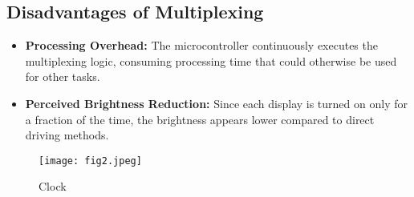 \documentclass[12pt]{article}
\begin{document}
\subsection{Disadvantages of Multiplexing}
\begin{itemize}
    \item \textbf{Processing Overhead:} The microcontroller continuously executes the multiplexing logic, consuming processing time that could otherwise be used for other tasks.
    \item \textbf{Perceived Brightness Reduction:} Since each display is turned on only for a fraction of the time, the brightness appears lower compared to direct driving methods.


\end{itemize}

\begin{figure}[H]
    \centering
    \texttt{[image: fig2.jpeg]}
    \caption{Clock}
    \label{fig:enter-label}
\end{figure}
\end{document}
